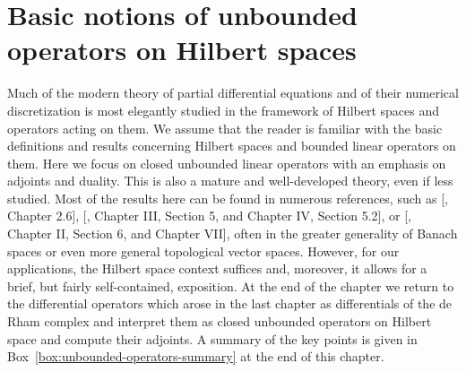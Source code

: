 \clearpage\setcounter{section}{2}
\section{{Basic notions of unbounded operators on Hilbert spaces}}\label{chap:unbounded-operators}

{Much of the modern theory of partial differential equations and of their numerical discretization is most elegantly studied in the framework of Hilbert spaces and operators acting on them. We assume that the reader is familiar with the basic definitions and results concerning Hilbert spaces and bounded linear operators on them. Here we focus on closed unbounded linear operators with an emphasis on adjoints and duality. This is also a mature and well-developed theory, even if less studied. Most of the results here can be found in numerous references, such as [, Chapter 2.6], [, Chapter III, Section 5, and Chapter IV, Section 5.2], or [, Chapter II, Section 6, and Chapter VII], often in the greater generality of Banach spaces or even more general topological vector spaces. However, for our applications, the Hilbert space context suffices and, moreover, it allows for a brief, but fairly self-contained, exposition. At the end of the chapter we return to the differential operators which arose in the last chapter as differentials of the de Rham complex and interpret them as closed unbounded operators on Hilbert space and compute their adjoints. A summary of the key points is given in Box~\ref{box:unbounded-operators-summary} at the end of this chapter.}
